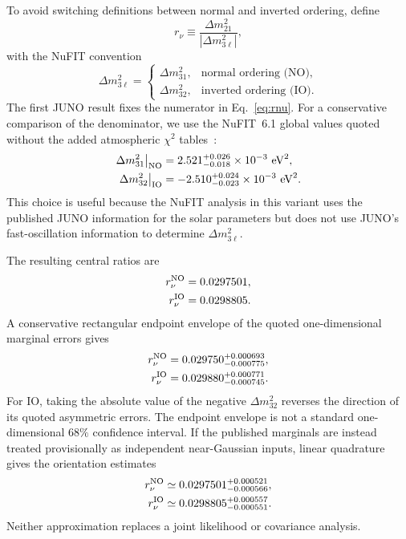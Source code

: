 \documentclass[10pt,twocolumn]{article}
\newcommand{\rnu}{r_{\nu}}
\begin{document}
To avoid switching definitions between normal and inverted ordering, define
\begin{equation}
\boxed{
\rnu
\equiv
\frac{\Delta m^2_{21}}{|\Delta m^2_{3\ell}|},
}
\label{eq:rnu}
\end{equation}
with the NuFIT convention
\begin{equation}
\Delta m^2_{3\ell}
=
\begin{cases}
\Delta m^2_{31}, & \text{normal ordering (NO)},\\
\Delta m^2_{32}, & \text{inverted ordering (IO)}.
\end{cases}
\end{equation}
The first JUNO result fixes the numerator in
Eq.~\eqref{eq:rnu}.  For a conservative comparison of the denominator, we use
the NuFIT~6.1 global values quoted without the added atmospheric
$\chi^2$ tables~\cite{Esteban2026}:
\begin{align}
\Delta m^2_{31}\big|_{\rm NO}
&=
2.521^{+0.026}_{-0.018}
\times10^{-3}\ \mathrm{eV}^2,
\label{eq:no31}\\
\Delta m^2_{32}\big|_{\rm IO}
&=
-2.510^{+0.024}_{-0.023}
\times10^{-3}\ \mathrm{eV}^2.
\label{eq:io32}
\end{align}
This choice is useful because the NuFIT analysis in this variant uses the
published JUNO information for the solar parameters but does not use JUNO's
fast-oscillation information to determine $\Delta m^2_{3\ell}$.

The resulting central ratios are
\begin{align}
\rnu^{\rm NO}
&=0.0297501,
\label{eq:rno}\\
\rnu^{\rm IO}
&=0.0298805.
\label{eq:rio}
\end{align}
A conservative rectangular endpoint envelope of the quoted one-dimensional
marginal errors gives
\begin{align}
\rnu^{\rm NO}
&=0.029750^{+0.000693}_{-0.000775},\\
\rnu^{\rm IO}
&=0.029880^{+0.000771}_{-0.000745}.
\end{align}
For IO, taking the absolute value of the negative
$\Delta m^2_{32}$ reverses the direction of its quoted asymmetric errors.
The endpoint envelope is not a standard one-dimensional $68\%$ confidence
interval.  If the published marginals are instead treated provisionally as
independent near-Gaussian inputs, linear quadrature gives the orientation
estimates
\begin{align}
\rnu^{\rm NO}
&\simeq0.0297501^{+0.000521}_{-0.000566},\\
\rnu^{\rm IO}
&\simeq0.0298805^{+0.000557}_{-0.000551}.
\end{align}
Neither approximation replaces a joint likelihood or covariance analysis.
\end{document}
